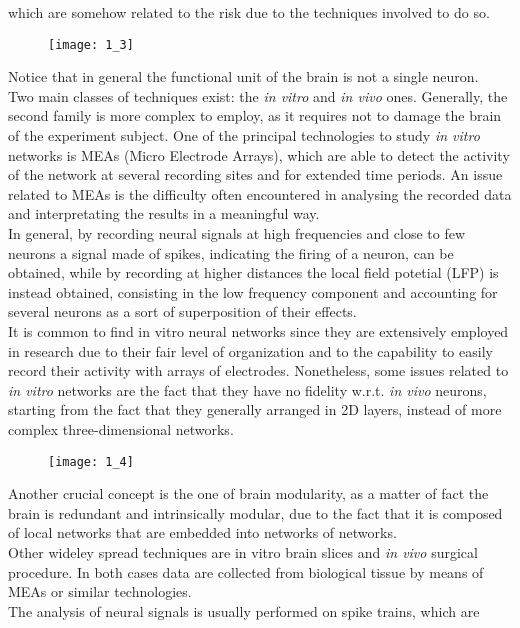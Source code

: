 which are somehow related to the risk due to the techniques involved to do so.
\begin{figure}[H]
    \texttt{[image: 1\_3]}
    \centering
\end{figure}
Notice that in general the functional unit of the brain is not a single neuron.\\
Two main classes of techniques exist: the \textit{in vitro} and \textit{in vivo} ones. Generally, the
second family is more complex to employ, as it requires not to damage the brain of
the experiment subject. One of the principal technologies to study \textit{in vitro} networks
is MEAs (Micro Electrode Arrays), which are able to detect the activity
of the network at several recording sites and for extended time periods. An issue
related to MEAs is the difficulty often encountered in analysing the recorded data
and interpretating the results in a meaningful way.\\
In general, by recording neural signals at high frequencies and close to few
neurons a signal made of spikes, indicating the firing of a neuron, can be obtained,
while by recording at higher distances the local field potetial (LFP) is instead
obtained, consisting in the low frequency component and accounting for several
neurons as a sort of superposition of their effects.\\
It is common to find in vitro neural networks since they are extensively employed in
research due to their fair level of organization and to the capability to easily
record their activity with arrays of electrodes. Nonetheless, some issues related to
\textit{in vitro} networks are the fact that they have no fidelity w.r.t. \textit{in vivo} neurons,
starting from the fact that they generally arranged in 2D layers, instead of
more complex three-dimensional networks.
\begin{figure}[H]
    \texttt{[image: 1\_4]}
    \centering
\end{figure}
Another crucial concept is the one of brain modularity, as a matter of fact the brain
is redundant and intrinsically modular, due to the fact that it is composed of
local networks that are embedded into networks of networks.\\
Other wideley spread techniques are in vitro brain slices and \textit{in vivo} surgical
procedure. In both cases data are collected from biological tissue by means of
MEAs or similar technologies.\\
The analysis of neural signals is usually performed on spike trains, which are
